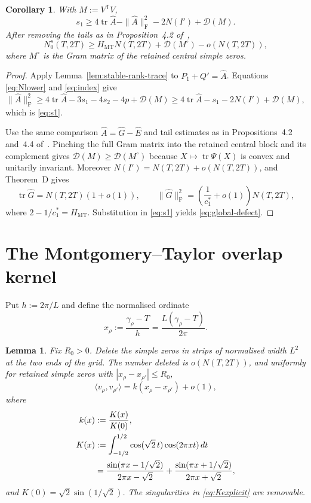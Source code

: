 \documentclass[11pt]{article}
\newtheorem{lemma}[theorem]{Lemma}
\newtheorem{corollary}[theorem]{Corollary}
\DeclareMathOperator{\tr}{tr}
\newcommand{\F}{\mathrm F}
\newcommand{\cD}{\mathcal D}
\begin{document}
\begin{corollary}\label{cor:count}
With $M:=V^{\mathsf T}V$,
\begin{equation}\label{eq:s1}
 s_1\ge4\tr\widehat A-\|\widehat A\|_{\F}^2-2N(I')+\cD(M).
\end{equation}
After removing the tails as in Proposition~4.2 of~\cite{Claude26},
\begin{equation}\label{eq:global-defect}
 N_0^s(T,2T)
 \ge H_{\mathrm{MT}}N(T,2T)+\cD(M^\circ)-o(N(T,2T)),
\end{equation}
where $M^\circ$ is the Gram matrix of the retained central simple zeros.
\end{corollary}

\begin{proof}
Apply Lemma~\ref{lem:stable-rank-trace} to
$P_1+Q'=\widehat A$.  Equations \eqref{eq:Nlower} and \eqref{eq:index}
give
\[
 \|\widehat A\|_{\F}^2
 \ge4\tr\widehat A-3s_1-4s_2-4p+\cD(M)
 \ge4\tr\widehat A-s_1-2N(I')+\cD(M),
\]
which is \eqref{eq:s1}.

Use the same comparison $\widehat A=\widehat G-\widehat E$ and tail
estimates as in Propositions~4.2 and~4.4 of~\cite{Claude26}.  Pinching the
full Gram matrix into the retained central block and its complement gives
$\cD(M)\ge\cD(M^\circ)$ because $X\mapsto\tr\Psi(X)$ is convex and
unitarily invariant.  Moreover $N(I')=N(T,2T)+o(N(T,2T))$, and Theorem~D
gives
\[
 \tr\widehat G=N(T,2T)(1+o(1)),\qquad
 \|\widehat G\|_{\F}^2
 =\left(\frac1{c_1^*}+o(1)\right)N(T,2T),
\]
where $2-1/c_1^*=H_{\mathrm{MT}}$.  Substitution in \eqref{eq:s1}
yields \eqref{eq:global-defect}.
\end{proof}

\section{The Montgomery--Taylor overlap kernel}

Put $h:=2\pi/L$ and define the normalised ordinate
\[
 x_\rho:=\frac{\gamma_\rho-T}{h}
 =\frac{L(\gamma_\rho-T)}{2\pi}.
\]

\begin{lemma}\label{lem:kernel-limit}
Fix $R_0>0$.  Delete the simple zeros in strips of normalised width $L^2$
at the two ends of the grid.  The number deleted is $o(N(T,2T))$, and
uniformly for retained simple zeros with $|x_\rho-x_{\rho'}|\le R_0$,
\begin{equation}\label{eq:kernel-limit}
 \langle v_\rho,v_{\rho'}\rangle
 =k(x_\rho-x_{\rho'})+o(1),
\end{equation}
where
\begin{align}
 k(x)&:=\frac{K(x)}{K(0)},\label{eq:kdef}\\
 K(x)&:=\int_{-1/2}^{1/2}\cos(\sqrt2\,t)\cos(2\pi xt)\,dt\notag\\
 &=\frac{\sin(\pi x-1/\sqrt2)}{2\pi x-\sqrt2}
   +\frac{\sin(\pi x+1/\sqrt2)}{2\pi x+\sqrt2},\label{eq:Kexplicit}
\end{align}
and $K(0)=\sqrt2\sin(1/\sqrt2)$.  The singularities in
\eqref{eq:Kexplicit} are removable.
\end{lemma}
\end{document}
